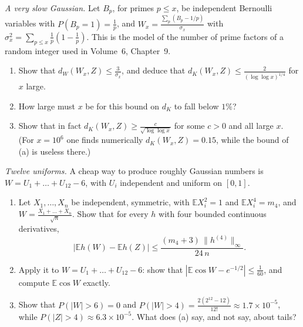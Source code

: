 \begin{exercise}[$\star$]\label{pb:kubslow}
\emph{A very slow Gaussian.} Let $B_p$, for primes $p\le x$, be independent Bernoulli variables with $P(B_p=1)=\frac1p$, and $W_x=\frac{\sum_p(B_p-1/p)}{\sigma_x}$ with
$\sigma_x^2=\sum_{p\le x}\frac1p(1-\frac1p)$. This is the model of the number of prime factors of a random integer used in Volume~6, Chapter~9.
\begin{enumerate}[label=(\alph*)]
\item Show that $d_W(W_x,Z)\le\frac3{\sigma_x}$, and deduce that $d_K(W_x,Z)\le\frac{2}{(\log\log x)^{1/4}}$ for $x$ large.
\item How large must $x$ be for this bound on $d_K$ to fall below $1\%$?
\item Show that in fact $d_K(W_x,Z)\ge\frac c{\sqrt{\log\log x}}$ for some $c>0$ and all large $x$. (For $x=10^6$ one finds numerically $d_K(W_x,Z)=0.15$, while the bound of (a) is useless there.)
\end{enumerate}
\end{exercise}

\begin{exercise}[$\star\star$]\label{pb:twelve}
\emph{Twelve uniforms.} A cheap way to produce roughly Gaussian numbers is $W=U_1+\dots+U_{12}-6$, with $U_i$ independent and uniform on $[0,1]$.
\begin{enumerate}[label=(\alph*)]
\item Let $X_1,\dots,X_n$ be independent, symmetric, with $\mathbb EX_i^2=1$ and $\mathbb EX_i^4=m_4$, and $W=\frac{X_1+\dots+X_n}{\sqrt n}$. Show that for every $h$ with four
bounded continuous derivatives,
\[
\bigl|\mathbb Eh(W)-\mathbb Eh(Z)\bigr|\le\frac{(m_4+3)\,\|h^{(4)}\|_\infty}{24\,n}.
\]
\item Apply it to $W=U_1+\dots+U_{12}-6$: show that $|\mathbb E\cos W-e^{-1/2}|\le\frac1{60}$, and compute $\mathbb E\cos W$ exactly.
\item Show that $P(|W|>6)=0$ and $P(|W|>4)=\frac{2(2^{12}-12)}{12!}\approx1.7\times10^{-5}$, while $P(|Z|>4)\approx6.3\times10^{-5}$. What does (a) say, and not say, about tails?
\end{enumerate}
\end{exercise}


